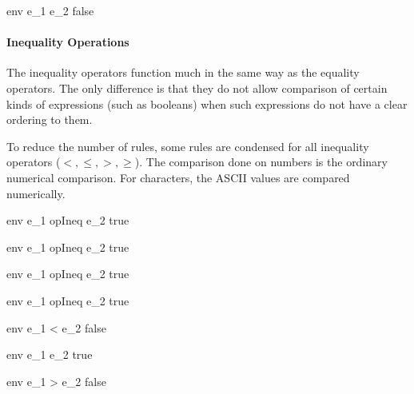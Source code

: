 \documentclass{article}
\begin{document}
    {\mbox{env} \vdash e_1 \neq e_2 \Downarrow false}

\bigskip

\paragraph{Inequality Operations}
The inequality operators function much in the same way as the equality operators.
The only difference is that they do not allow comparison of certain kinds of expressions (such as booleans) when such expressions do not have a clear ordering to them.

To reduce the number of rules, some rules are condensed for all inequality operators ($<, \leq, >, \geq$).
The comparison done on numbers is the ordinary numerical comparison.
For characters, the ASCII values are compared numerically.

    {\mbox{env} \vdash e_1 \; opIneq \; e_2 \Downarrow true}

    {\mbox{env} \vdash e_1 \; opIneq \; e_2 \Downarrow true}

\medskip

    {\mbox{env} \vdash e_1 \; opIneq \; e_2 \Downarrow true}

    {\mbox{env} \vdash e_1 \; opIneq \; e_2 \Downarrow true}

\medskip

    {\mbox{env} \vdash e_1 < e_2 \Downarrow false}

    {\mbox{env} \vdash e_1 \leq e_2 \Downarrow true}

    {\mbox{env} \vdash e_1 > e_2 \Downarrow false}
\end{document}
